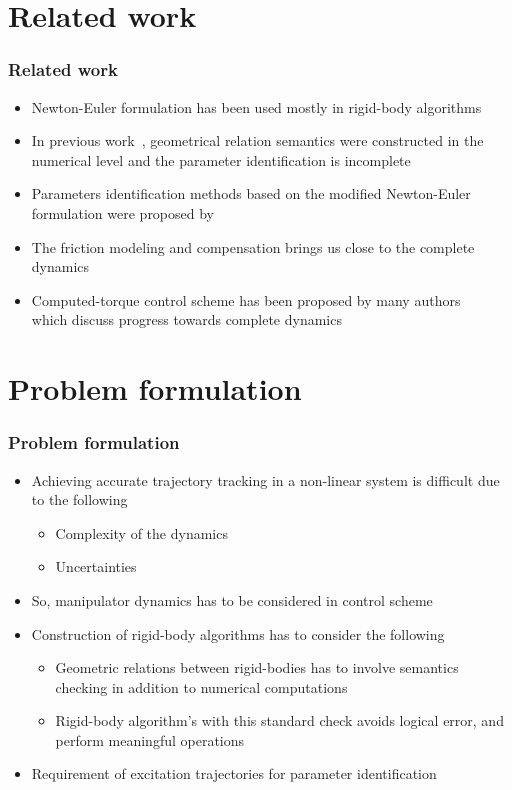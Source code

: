 \documentclass{beamer}
\begin{document}
\section{Related work}
\begin{frame}
	\frametitle{Related work}
	\vspace{-0.5cm}
	\begin{itemize}
		\item Newton-Euler formulation has been used mostly in rigid-body algorithms~\cite{p3}~\cite{p4}~\cite{p5}~\cite{p8}
		\item In previous work~\cite{p7}, geometrical relation semantics were constructed in the numerical level and the parameter identification is incomplete
		\item Parameters identification methods based on the modified Newton-Euler formulation were proposed by~\cite{p3}~\cite{p6}
		\item The friction modeling and compensation brings us close to the complete dynamics~\cite{p10}~\cite{p11}
		\item Computed-torque control scheme has been proposed by many authors~\cite{p2}~\cite{p9} which discuss progress towards complete dynamics
	\end{itemize}
\end{frame}

\section{Problem formulation}
\begin{frame}
	\frametitle{Problem formulation}
	\vspace{-0.5cm}
	\begin{itemize}
		\item Achieving accurate trajectory tracking in a non-linear system is difficult due to the following
		\begin{itemize}
		\item Complexity of the dynamics
		\item Uncertainties 
		\end{itemize}
		\item So, manipulator dynamics has to be considered in control scheme
		\item Construction of rigid-body algorithms has to consider the following
		\begin{itemize}
		\item Geometric relations between rigid-bodies has to involve semantics checking in addition to numerical computations
		\item Rigid-body algorithm's with this standard check avoids logical error, and perform meaningful operations
		\end{itemize}
		\item Requirement of excitation trajectories for parameter identification 
	\end{itemize}
\end{frame}
\end{document}
